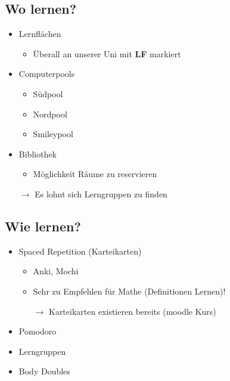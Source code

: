 \documentclass[
	aspectratio=169, 
	10pt 
]{beamer}
\begin{document}
\subsection{Wo lernen?}
\begin{frame}{\insertsubsection}
    \begin{itemize}
        \item Lernflächen \begin{itemize} \item Überall an unserer Uni mit \textbf{LF} markiert \end{itemize}
        \item Computerpools \begin{itemize}
            \item Südpool
            \item Nordpool
            \item Smileypool \end{itemize}
        \item Bibliothek \begin{itemize} \item Möglichkeit Räume zu reservieren \end{itemize}
        \item[$\rightarrow$] Es lohnt sich Lerngruppen zu finden 
    \end{itemize}
\end{frame}

\subsection{Wie lernen?}
\begin{frame}{\insertsubsection}
    \begin{itemize}
        \item Spaced Repetition (Karteikarten) \begin{itemize}
            \item Anki, Mochi
            \item Sehr zu Empfehlen für Mathe (Definitionen Lernen)! 
            \item[$\rightarrow$] Karteikarten existieren bereits (moodle Kurs) 
        \end{itemize}
        \item Pomodoro
        \item Lerngruppen
        \item Body Doubles 
    \end{itemize}
\end{frame}
\end{document}
